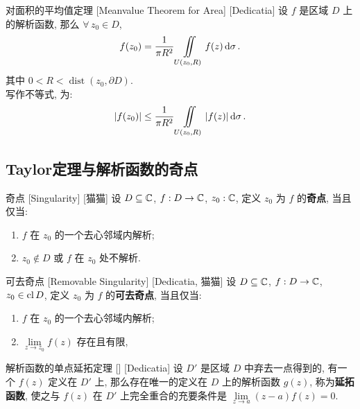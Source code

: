        \begin{thm}
            {对面积的平均值定理}
            [Meanvalue Theorem for Area]
            [Dedicatia]
            设 $f$ 是区域 $D$ 上的解析函数, 那么 $\forall\,z_0\in D$, 
            \[f(z_0)=\frac{1}{\pi R^2}\iintop_{U(z_0,R)}f(z)\dd{\sigma}.\]
            其中 $0<R<\operatorname{dist}(z_0,\partial D)$. \\
            写作不等式, 为:
            \[|f(z_0)|\leq\frac{1}{\pi R^2}\iintop_{U(z_0,R)}|f(z)|\dd{\sigma}.\]
        \end{thm}

    \subsection{Taylor定理与解析函数的奇点}
        
        \begin{dfn}
            [Singularity]
            {奇点}
            [Singularity]
            [猫猫]
            设 \(D\subseteq\operatorname{\mathbb{C}}\), \(f:D\to\operatorname{\mathbb{C}}\), \(z_0:\operatorname{\mathbb{C}}\), 定义 \(z_0\) 为 \(f\) 的\textbf{奇点}, 当且仅当: 
            \begin{enumerate}
                \item \(f\) 在 \(z_0\) 的一个去心邻域内解析; 
                \item \(z_0\notin D\) 或 \(f\) 在 \(z_0\) 处不解析. 
            \end{enumerate}
        \end{dfn}

        \begin{dfn}
            {可去奇点}
            [Removable Singularity]
            [Dedicatia, 猫猫]
            设 \(D\subseteq\operatorname{\mathbb{C}}\), \(f:D\to\operatorname{\mathbb{C}}\), \(z_0\in\operatorname{cl} D\), 定义 \(z_0\) 为 \(f\) 的\textbf{可去奇点}, 当且仅当: 
            \begin{enumerate}
                \item \(f\) 在 \(z_0\) 的一个去心邻域内解析; 
                \item \(\lim\limits_{z \to z_0} f(z)\) 存在且有限, 
            \end{enumerate}
        \end{dfn}
        
        \begin{thm}
            {解析函数的单点延拓定理}
            []
            [Dedicatia]
            设 \(D'\) 是区域 \(D\) 中弃去一点得到的, 有一个\Analytic{}  \(f(z)\) 定义在 \(D'\) 上, 那么存在唯一的定义在 \(D\) 上的解析函数 \(g(z)\), 称为\textbf{延拓函数}, 使之与 \(f(z)\) 在 \(D'\) 上完全重合的充要条件是 \(\lim\limits_{z\to a}(z-a)f(z)=0\).
        \end{thm}

